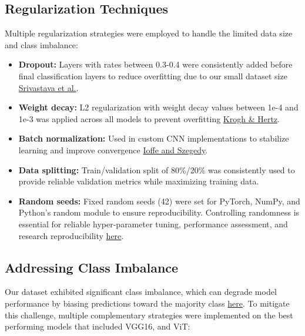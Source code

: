 \documentclass[a4paper,12pt]{report}
\begin{document}
\subsection{Regularization Techniques}

Multiple regularization strategies were employed to handle the limited data size and class imbalance:

\begin{itemize}
    \item \textbf{Dropout:} Layers with rates between 0.3-0.4 were consistently added before final classification layers to reduce overfitting due to our small dataset size \href{https://www.jmlr.org/papers/volume15/srivastava14a/srivastava14a.pdf}{Srivastava et al.}.
    
    \item \textbf{Weight decay:} L2 regularization with weight decay values between 1e-4 and 1e-3 was applied across all models to prevent overfitting \href{https://papers.nips.cc/paper/1991/file/8eefcfdf5990e441f0fb6f3fad709e21-Paper.pdf}{Krogh \& Hertz}.
    
    \item \textbf{Batch normalization:} Used in custom CNN implementations to stabilize learning and improve convergence \href{https://arxiv.org/abs/1502.03167}{Ioffe and Szegedy}.
    
    \item \textbf{Data splitting:} Train/validation split of 80\%/20\% was consistently used to provide reliable validation metrics while maximizing training data.
    
    \item \textbf{Random seeds:} Fixed random seeds (42) were set for PyTorch, NumPy, and Python's random module to ensure reproducibility. Controlling randomness is essential for reliable hyper-parameter tuning, performance assessment, and research reproducibility \href{https://ieeexplore.ieee.org/stamp/stamp.jsp?tp=&arnumber=10533638&tag=}{here}.
\end{itemize}

\subsection{Addressing Class Imbalance}

Our dataset exhibited significant class imbalance, which can degrade model performance by biasing predictions toward the majority class \href{https://journalofbigdata.springeropen.com/articles/10.1186/s40537-019-0192-5}{here}. To mitigate this challenge, multiple complementary strategies were implemented on the best performing models that included VGG16, and ViT:
\end{document}
